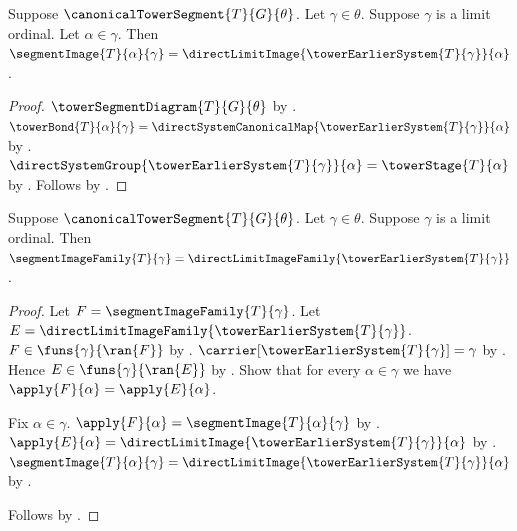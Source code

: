 \begin{proposition}\label{segment_image_at_limit}
    Suppose $\canonicalTowerSegment{T}{G}{\theta}$.
    Let $\gamma\in\theta$.
    Suppose $\gamma$ is a limit ordinal.
    Let $\alpha\in\gamma$.
    Then $\segmentImage{T}{\alpha}{\gamma}=
        \directLimitImage{\towerEarlierSystem{T}{\gamma}}{\alpha}$.
\end{proposition}
\begin{proof}
    $\towerSegmentDiagram{T}{G}{\theta}$ by
        .
    $\towerBond{T}{\alpha}{\gamma}=
        \directSystemCanonicalMap{
            \towerEarlierSystem{T}{\gamma}}{\alpha}$ by
        .
    $\directSystemGroup{\towerEarlierSystem{T}{\gamma}}{\alpha}=
        \towerStage{T}{\alpha}$ by
        .
    Follows by .
\end{proof}

\begin{proposition}\label{segment_image_family_at_limit}
    Suppose $\canonicalTowerSegment{T}{G}{\theta}$.
    Let $\gamma\in\theta$.
    Suppose $\gamma$ is a limit ordinal.
    Then $\segmentImageFamily{T}{\gamma}=
        \directLimitImageFamily{\towerEarlierSystem{T}{\gamma}}$.
\end{proposition}
\begin{proof}
    Let $F=\segmentImageFamily{T}{\gamma}$.
    Let $E=\directLimitImageFamily{\towerEarlierSystem{T}{\gamma}}$.
    $F\in\funs{\gamma}{\ran{F}}$ by
        .
    $\carrier[\towerEarlierSystem{T}{\gamma}]=\gamma$ by
        .
    Hence $E\in\funs{\gamma}{\ran{E}}$ by
        .
    Show that for every $\alpha\in\gamma$ we have
        $\apply{F}{\alpha}=\apply{E}{\alpha}$.
    \begin{subproof}
        Fix $\alpha\in\gamma$.
        $\apply{F}{\alpha}=\segmentImage{T}{\alpha}{\gamma}$ by
            .
        $\apply{E}{\alpha}=
            \directLimitImage{\towerEarlierSystem{T}{\gamma}}{\alpha}$ by
            .
        $\segmentImage{T}{\alpha}{\gamma}=
            \directLimitImage{\towerEarlierSystem{T}{\gamma}}{\alpha}$ by
            .
    \end{subproof}
    Follows by .
\end{proof}


